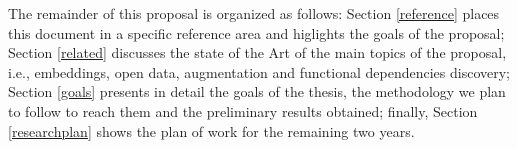 The remainder of this proposal is organized as follows: Section \ref{reference} places this document in a specific reference area and higlights the goals of the proposal; Section \ref{related} discusses the state of the Art of the main topics of the proposal, i.e., embeddings, open data, augmentation and functional dependencies discovery; Section \ref{goals} presents in detail the goals of the thesis, the methodology we plan to follow to reach them and the preliminary results obtained; finally, Section \ref{researchplan} shows the plan of work for the remaining two years. 
\bigbreak 


